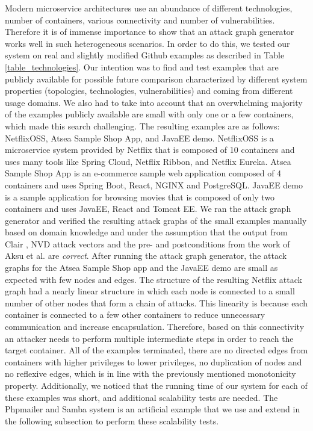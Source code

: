 Modern microservice architectures use an abundance of different technologies,  number of containers, various connectivity and number of vulnerabilities. Therefore it is of immense importance to show that an attack graph generator works well in such heterogeneous scenarios. In order to do this, we tested our system on real and slightly modified Github examples as described in Table \ref{table_technologies}. Our intention was to find and test examples that are publicly available for possible future comparison characterized by different system properties (topologies, technologies, vulnerabilities) and coming from different usage domains. We also had to take into account that an overwhelming majority of the examples publicly available are small with only one or a few containers, which made this search challenging. The resulting examples are as follows: NetflixOSS, Atsea Sample Shop App, and JavaEE demo. NetflixOSS is a microservice system provided by Netflix that is composed of 10 containers and uses many tools like Spring Cloud, Netflix Ribbon, and Netflix Eureka. Atsea Sample Shop App is an e-commerce sample web application composed of 4 containers and uses Spring Boot, React, NGINX and PostgreSQL. JavaEE demo is a sample application for browsing movies that is composed of only two containers and uses JavaEE, React and Tomcat EE. We ran the attack graph generator and verified the resulting attack graphs of the small examples manually based on domain knowledge and under the assumption that the output from Clair \cite{clair}, NVD attack vectors \cite{booth2013national} and the pre- and postconditions from the work of Aksu et al. \cite{aksu2018automated} are \textit{correct}. After running the attack graph generator, the attack graphs for the Atsea Sample Shop app and the JavaEE demo are small as expected with few nodes and edges. The structure of the resulting Netflix attack graph had a nearly linear structure in which each node is connected to a small number of other nodes that form a chain of attacks. This linearity is because each container is connected to a few other containers to reduce unnecessary communication and increase encapsulation. Therefore, based on this connectivity an attacker needs to perform multiple intermediate steps in order to reach the target container. All of the examples terminated, there are no directed edges from containers with higher privileges to lower privileges, no duplication of nodes and no reflexive edges, which is in line with the previously mentioned monotonicity property. Additionally, we noticed that the running time of our system for each of these examples was short, and additional scalability tests are needed. The Phpmailer and Samba  system is an artificial example that we use and extend in the following subsection to perform these scalability tests.



